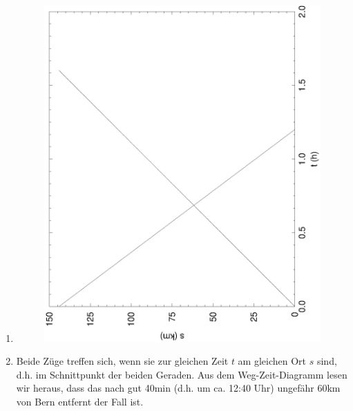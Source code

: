 \documentclass[%
11pt,%
twoside,%
titlepage,%
german,%
]{scrartcl}
\begin{document}
\begin{enumerate}
\begin{enumerate}
  \item \mbox{}
      \begin{figure}[h]
        \centering
        \includegraphics[angle=-90,width=\columnwidth]{pictures/zug.eps}
      \end{figure}
  \item Beide Z\"uge treffen sich, wenn sie zur gleichen Zeit $t$ am gleichen Ort $s$ sind, d.h. im Schnittpunkt der beiden Geraden. Aus dem Weg-Zeit-Diagramm lesen wir heraus, dass das nach gut 40\unit{min} (d.h. um ca. 12:40 Uhr) ungef\"ahr 60\unit{km} von Bern entfernt der Fall ist.


\end{enumerate}
\end{enumerate}
\end{document}
